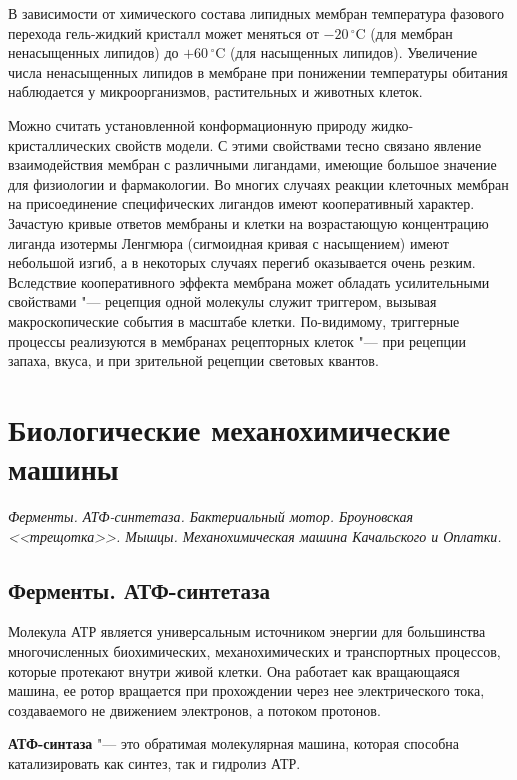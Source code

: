 \documentclass[12pt,a4paper,oneside]{book}
\newcommand{\celcius}{\,^{\circ}\mathrm{C}} %
\begin{document}
В зависимости от химического состава липидных мембран температура фазового перехода гель-жидкий кристалл может меняться от $-20\celcius$ (для мембран ненасыщенных липидов) до $+60\celcius$ (для насыщенных липидов). Увеличение числа ненасыщенных липидов в мембране при понижении температуры обитания наблюдается у микроорганизмов, растительных и животных клеток. 

Можно считать установленной конформационную природу жидко-кристаллических свойств модели. С этими свойствами тесно связано явление взаимодействия мембран с различными лигандами, имеющие большое значение для физиологии и фармакологии. 
Во многих случаях реакции клеточных мембран на присоединение специфических лигандов имеют кооперативный характер. Зачастую кривые ответов мембраны и клетки на возрастающую концентрацию лиганда изотермы Ленгмюра (сигмоидная кривая с насыщением) имеют небольшой изгиб, а в некоторых случаях перегиб оказывается очень резким. Вследствие кооперативного эффекта мембрана может обладать усилительными свойствами "--- рецепция одной молекулы служит триггером, вызывая макроскопические события в масштабе клетки. По-видимому, триггерные процессы реализуются в мембранах рецепторных клеток "--- при рецепции запаха, вкуса, и при зрительной рецепции световых квантов. 


\newpage
\section{Биологические механохимические машины}
{\it Ферменты. АТФ-синтетаза. Бактериальный мотор. Броуновская <<трещотка>>. Мышцы. Механохимическая машина Качальского и Оплатки.}

\subsection{Ферменты. АТФ-синтетаза}

Молекула АТР является универсальным источником энергии для большинства многочисленных биохимических, механохимических и транспортных процессов, которые протекают внутри живой клетки. Она работает как вращающаяся машина, ее ротор вращается при прохождении через нее электрического тока, создаваемого не движением электронов, а потоком протонов.

{\bf АТФ-синтаза} "--- это обратимая молекулярная машина, которая способна катализировать как синтез, так и гидролиз АТР.
\end{document}
